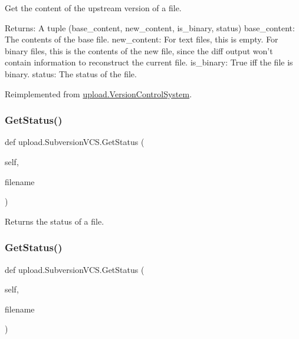 \begin{DoxyVerb}Get the content of the upstream version of a file.

Returns:
  A tuple (base_content, new_content, is_binary, status)
base_content: The contents of the base file.
new_content: For text files, this is empty.  For binary files, this is
  the contents of the new file, since the diff output won't contain
  information to reconstruct the current file.
is_binary: True iff the file is binary.
status: The status of the file.
\end{DoxyVerb}
 

Reimplemented from \mbox{\hyperlink{classupload_1_1_version_control_system_adfd9d4ecba422102233a2ba13e5bfaf5}{upload.\+Version\+Control\+System}}.

\mbox{\label{classupload_1_1_subversion_v_c_s_ac3785eb1fa561088206d01570f9fe982}} 
\subsubsection{\texorpdfstring{GetStatus()}{GetStatus()}\hspace{0.1cm}{\footnotesize\ttfamily [1/2]}}
{\footnotesize\ttfamily def upload.\+Subversion\+V\+C\+S.\+Get\+Status (\begin{DoxyParamCaption}\item[{}]{self,  }\item[{}]{filename }\end{DoxyParamCaption})}

\begin{DoxyVerb}Returns the status of a file.\end{DoxyVerb}
 \mbox{\label{classupload_1_1_subversion_v_c_s_ac3785eb1fa561088206d01570f9fe982}} 
\subsubsection{\texorpdfstring{GetStatus()}{GetStatus()}\hspace{0.1cm}{\footnotesize\ttfamily [2/2]}}
{\footnotesize\ttfamily def upload.\+Subversion\+V\+C\+S.\+Get\+Status (\begin{DoxyParamCaption}\item[{}]{self,  }\item[{}]{filename }\end{DoxyParamCaption})}

